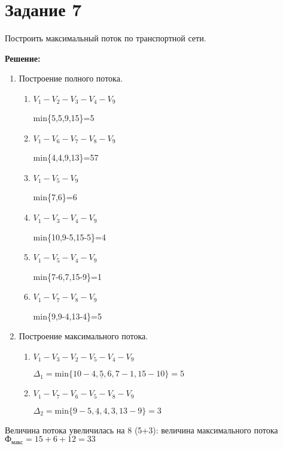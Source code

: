 \section*{Задание 7}

Построить максимальный поток по транспортной сети.


{\large\textbf{Решение:}}

\begin{enumerate}
  \item Построение полного потока.

  \hspace{8cm}

  \vspace{-7cm}
  \begin{enumerate}
    \item $V_1-V_2-V_3-V_4-V_9$

    min\{5,5,9,15\}=5

    \item $V_1-V_6-V_7-V_8-V_9$

    min\{4,4,9,13\}=57

    \item $V_1-V_5-V_9$

    min\{7,6\}=6

    \item $V_1-V_3-V_4-V_9$

    min\{10,9-5,15-5\}=4

    \item $V_1-V_5-V_4-V_9$

    min\{7-6,7,15-9\}=1

    \item $V_1-V_7-V_8-V_9$

    min\{9,9-4,13-4\}=5
  \end{enumerate}

  \item Построение максимального потока.

  \hspace{8cm}

  \vspace{-7cm}

    \begin{enumerate}
      \item $V_1-V_3-V_2-V_5-V_4-V_9$

      $\Delta_1=\text{min}\{10-4,\underline{5},6,7-1,15-10\}=5$

      \item $V_1-V_7-V_6-V_5-V_8-V_9$

      $\Delta_2=\text{min}\{9-5,\underline{4},4,3,13-9\}=3$
    \end{enumerate}

\end{enumerate}

\vspace{3.5cm}

Величина потока увеличилась на 8 (5+3): величина максимального потока $\text{Ф}_\text{макс}=15+6+12=33$

\newpage
